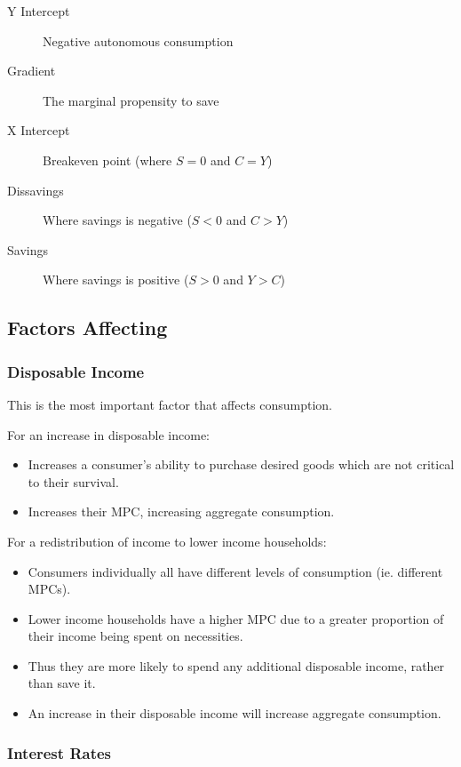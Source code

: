 \documentclass[a4paper,11pt]{article}
\begin{document}
\begin{description}
\item [Y Intercept] Negative autonomous consumption
\item [Gradient] The marginal propensity to save
\item [X Intercept] Breakeven point (where $S = 0$ and $C = Y$)
\item [Dissavings] Where savings is negative ($S < 0$ and $C > Y$)
\item [Savings] Where savings is positive ($S > 0$ and $Y > C$)
\end{description}


\subsection{Factors Affecting}

\subsubsection{Disposable Income}

This is the most important factor that affects consumption.

For an increase in disposable income:

\begin{itemize}
\item Increases a consumer's ability to purchase desired goods which are not
	critical to their survival.
\item Increases their MPC, increasing aggregate consumption.
\end{itemize}

For a redistribution of income to lower income households:

\begin{itemize}
\item Consumers individually all have different levels of consumption (ie.
	different MPCs).
\item Lower income households have a higher MPC due to a greater proportion of
	their income being spent on necessities.
\item Thus they are more likely to spend any additional disposable income,
	rather than save it.
\item An increase in their disposable income will increase aggregate
	consumption.
\end{itemize}


\subsubsection{Interest Rates}
\end{document}
